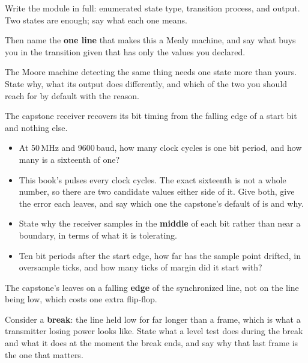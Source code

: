 \noindent Write the module in full: enumerated state type, transition process, and output. Two
states are enough; say what each one means.

Then name the \textbf{one line} that makes this a Mealy machine, and say what 
buys you in the transition  given that  has only the values you declared.

 The Moore machine detecting the same thing needs one state more than yours. State why,
what its output does differently, and which of the two you should reach for by default with the
reason. 

 The capstone receiver recovers its bit timing from the falling edge of a start bit and
nothing else.
\begin{itemize}
  \item At 50\,MHz and 9600\,baud, how many clock cycles is one bit period, and how many is a
    sixteenth of one?
  \item This book's  pulses every  clock cycles. The exact
    sixteenth is not a whole number, so there are two candidate  values either
    side of it. Give both, give the error each leaves, and say which one the capstone's default of
     is and why.
  \item State why the receiver samples in the \textbf{middle} of each bit rather than near a
    boundary, in terms of what it is tolerating.
  \item Ten bit periods after the start edge, how far has the sample point drifted, in oversample
    ticks, and how many ticks of margin did it start with? 
\end{itemize}

 The capstone's  leaves on a falling \textbf{edge} of the synchronized
line, not on the line being low, which costs one extra flip-flop.

Consider a \textbf{break}: the line held low for far longer than a frame, which is what a
transmitter losing power looks like. State what a level test does during the break and what it does
at the moment the break ends, and say why that last frame is the one that matters. 

